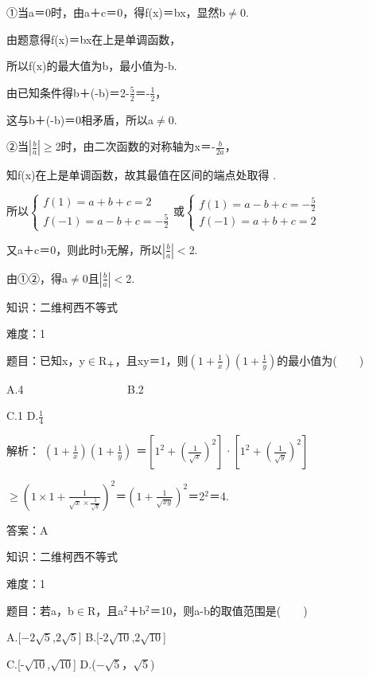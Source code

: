 \documentclass{article} %
\begin{document}
①当a＝0时，由a＋c＝0，得f(x)＝bx，显然b$\mathrm{\neq}$0.

由题意得f(x)＝bx在上是单调函数，

所以f(x)的最大值为{\textbar}b{\textbar}，最小值为-{\textbar}b{\textbar}.

由已知条件得{\textbar}b{\textbar}＋(-{\textbar}b{\textbar})＝2-$\frac{5}{2}$＝-$\frac{1}{2}$，

这与{\textbar}b{\textbar}＋(-{\textbar}b{\textbar})＝0相矛盾，所以a$\mathrm{\neq}$0.

②当$|\frac{b}{a}|\mathrm{\ge}$2时，由二次函数的对称轴为x＝-$\frac{b}{2a}$，

知f(x)在上是单调函数，故其最值在区间的端点处取得 .

所以$\left\{\begin{array}{r}
f(1)=a+b+c=2\\
f(-1)=a-b+c=-\frac{5}{2}
\end{array} \right.$或$\left\{\begin{array}{r}
f(1)=a-b+c=-\frac{5}{2}\\
f(-1)=a+b+c=2
\end{array} \right.$

又a＋c＝0，则此时b无解，所以$|\frac{b}{a}|\mathrm{<}$2.

由①②，得a$\mathrm{\neq}$0且$|\frac{b}{a}|\mathrm{<}$2.




 知识：二维柯西不等式

 难度：1

 题目：已知x，y$\mathrm{\in}$R${}_{\textrm{＋}}$，且xy＝1，则$(1+\frac{1}{x})(1+\frac{1}{y})$的最小值为(　　)

A.4　　　　　　　　　  B.2  

C.1           D.$\frac{1}{4}$

 解析： 
$(1+\frac{1}{x})(1+\frac{1}{y})$
＝$[1^2+(\frac{1}{\sqrt{x}})^2]$·$[1^2+(\frac{1}{\sqrt{y}})^2]$

$\mathrm{\ge}$$(1\times1+\frac{1}{\sqrt{x}\times\frac{1}{\sqrt{y}}})^2$＝$(1+\frac{1}{\sqrt{xy}})^2$＝2${}^{2}$＝4.

 答案：A

 

 知识：二维柯西不等式

 难度：1

 题目：若a，b$\mathrm{\in}$R，且a${}^{2}$＋b${}^{2}$＝10，则a-b的取值范围是(　　)

A.[$-2\sqrt{5}$,$2\sqrt{5}$]   B.[-$2\sqrt{10}$,$2\sqrt{10}$]

C.[-$\sqrt{10}$,$\sqrt{10}$]   D.($-\sqrt{5}$，$\sqrt{5}$)
\end{document}
